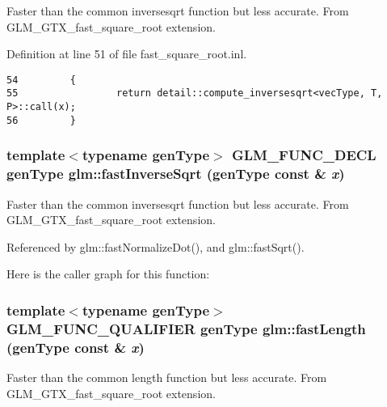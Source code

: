 Faster than the common inversesqrt function but less accurate. From GLM\_\-GTX\_\-fast\_\-square\_\-root extension. 

Definition at line 51 of file fast\_\-square\_\-root.inl.

\begin{Code}\begin{verbatim}54         {
55                 return detail::compute_inversesqrt<vecType, T, P>::call(x);
56         }
\end{verbatim}
\end{Code}


\hypertarget{group__gtx__fast__square__root_g38b3acc3e6a37b2e6f78e2bb29585047}{
\subsubsection[fastInverseSqrt]{\setlength{\rightskip}{0pt plus 5cm}template$<$typename genType$>$ GLM\_\-FUNC\_\-DECL genType glm::fastInverseSqrt (genType const \& {\em x})}}
\label{group__gtx__fast__square__root_g38b3acc3e6a37b2e6f78e2bb29585047}


Faster than the common inversesqrt function but less accurate. From GLM\_\-GTX\_\-fast\_\-square\_\-root extension. 

Referenced by glm::fastNormalizeDot(), and glm::fastSqrt().

Here is the caller graph for this function:\hypertarget{group__gtx__fast__square__root_g49395da3932ad3f2b33d6b874aa1de0d}{
\subsubsection[fastLength]{\setlength{\rightskip}{0pt plus 5cm}template$<$typename genType$>$ GLM\_\-FUNC\_\-QUALIFIER genType glm::fastLength (genType const \& {\em x})}}
\label{group__gtx__fast__square__root_g49395da3932ad3f2b33d6b874aa1de0d}


Faster than the common length function but less accurate. From GLM\_\-GTX\_\-fast\_\-square\_\-root extension. 

